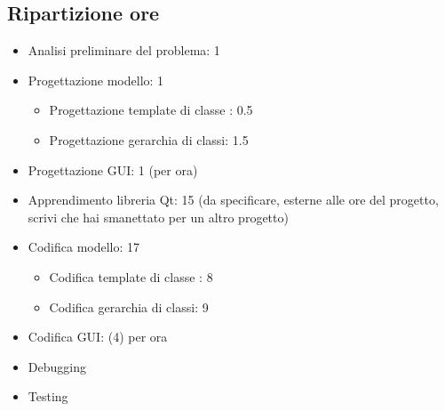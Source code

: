 \subsection{Ripartizione ore} %
\label{sub:ripartizione_ore}
\begin{itemize}
	\item Analisi preliminare del problema: 1
	\item Progettazione modello: 1
	\begin{itemize}
		\item Progettazione template di classe : 0.5
		\item Progettazione gerarchia di classi: 1.5
	\end{itemize}
	\item Progettazione GUI: 1 (per ora)
	\item Apprendimento libreria Qt: 15 (da specificare, esterne alle ore del progetto, scrivi che hai smanettato per un altro progetto)
	\item Codifica modello: 17
	\begin{itemize}
		\item Codifica template di classe : 8
		\item Codifica gerarchia di classi: 9
	\end{itemize}
	\item Codifica GUI: (4) per ora
	\item Debugging
	\item Testing
\end{itemize}
